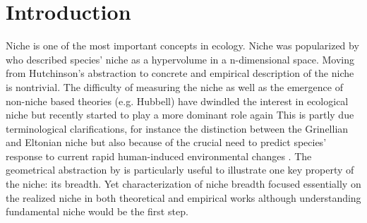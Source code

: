 \section*{Introduction}
Niche is one of the most important concepts in ecology.
Niche was popularized by \citet{Hutchinson1957} who described species' niche as a hypervolume in a n-dimensional space.
Moving from Hutchinson's abstraction to concrete and empirical description of the niche is nontrivial.
The difficulty of measuring the niche as well as the emergence of non-niche based theories  (e.g. Hubbell) have dwindled the interest in ecological niche but recently started to play a more dominant role again %
This is partly due terminological clarifications, for instance the distinction between the Grinellian and Eltonian niche \citep{Chase2003} but also because of the crucial need to predict species' response to current rapid human-induced environmental changes \citep[e.g.,][]{Parmesan2006, Kearney2009}. %
The geometrical abstraction by \citet{Hutchinson1957} is particularly useful to illustrate one key property of the niche: its breadth.
Yet  characterization of niche breadth focused essentially on the realized niche in both theoretical and empirical works although understanding fundamental niche would be the first step.


